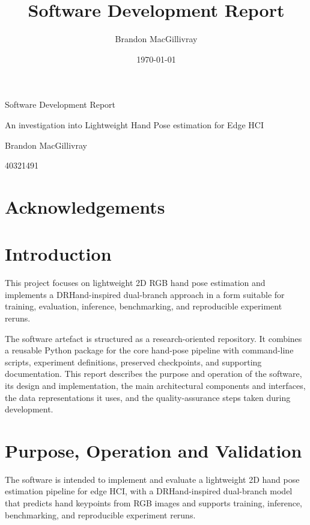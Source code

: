 ﻿\documentclass[11pt,a4paper]{article}
\title{Software Development Report}
\author{Brandon MacGillivray}
\date{\today}
\begin{document}
\hypersetup{pageanchor=false}
\begin{titlepage}
\centering
{\LARGE Software Development Report\par}
\vspace{1.5cm}
{\large An investigation into Lightweight Hand Pose estimation for Edge HCI\par}
\vspace{1cm}
{\large Brandon MacGillivray\par}
\vspace{0.5cm}
{\large 40321491\par}
\vfill
\end{titlepage}
\hypersetup{pageanchor=true}

\section*{Acknowledgements}

\tableofcontents
\newpage

\section{Introduction}

This project focuses on lightweight 2D RGB hand pose estimation and implements a
DRHand-inspired dual-branch approach in a form suitable for training,
evaluation, inference, benchmarking, and reproducible experiment reruns.

\medskip

The software artefact is structured as a research-oriented repository. It combines a reusable Python package for the core hand-pose pipeline with command-line scripts, experiment definitions, preserved checkpoints, and supporting documentation. This report describes the purpose and operation of the software, its design and implementation, the main architectural components and interfaces, the data representations it uses, and the quality-assurance steps taken during development.

\section{Purpose, Operation and Validation}

The software is intended to implement and evaluate a lightweight 2D hand pose estimation pipeline for edge HCI, with a DRHand-inspired dual-branch model that predicts hand keypoints from RGB images and supports training, inference, benchmarking, and reproducible experiment reruns.
\end{document}
